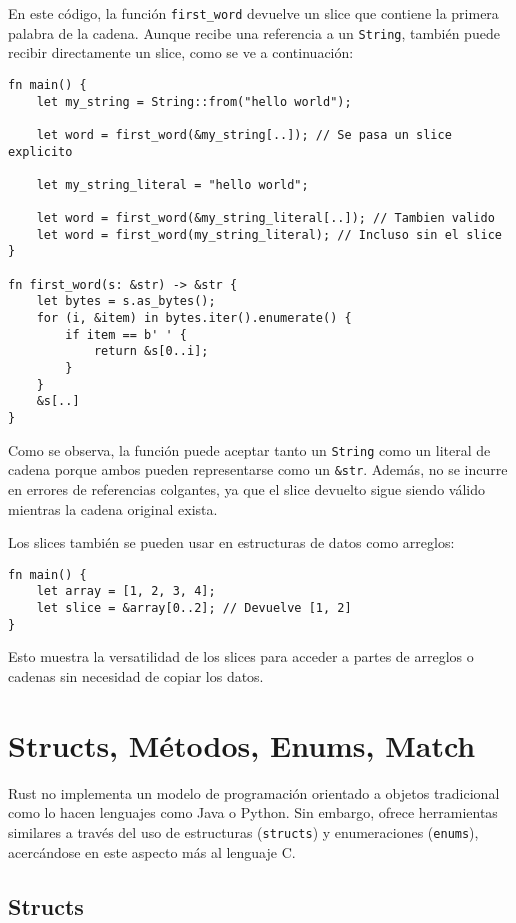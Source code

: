 \documentclass[12pt]{article}
\begin{document}
En este código, la función \texttt{first\_word} devuelve un slice que contiene la primera palabra de la cadena. Aunque recibe una referencia a un \texttt{String}, también puede recibir directamente un slice, como se ve a continuación:

\begin{lstlisting}[style=ruststyle]
fn main() {
	let my_string = String::from("hello world");

	let word = first_word(&my_string[..]); // Se pasa un slice explicito

	let my_string_literal = "hello world";

	let word = first_word(&my_string_literal[..]); // Tambien valido
	let word = first_word(my_string_literal); // Incluso sin el slice
}

fn first_word(s: &str) -> &str {
	let bytes = s.as_bytes();
	for (i, &item) in bytes.iter().enumerate() {
		if item == b' ' {
			return &s[0..i];
		}
	}
	&s[..]
}
\end{lstlisting}

Como se observa, la función puede aceptar tanto un \texttt{String} como un literal de cadena porque ambos pueden representarse como un \texttt{\&str}. Además, no se incurre en errores de referencias colgantes, ya que el slice devuelto sigue siendo válido mientras la cadena original exista.

Los slices también se pueden usar en estructuras de datos como arreglos:

\begin{lstlisting}[style=ruststyle]
fn main() {
	let array = [1, 2, 3, 4];
	let slice = &array[0..2]; // Devuelve [1, 2]
}
\end{lstlisting}

Esto muestra la versatilidad de los slices para acceder a partes de arreglos o cadenas sin necesidad de copiar los datos.

\section{Structs, Métodos, Enums, Match}

Rust no implementa un modelo de programación orientado a objetos tradicional como lo hacen lenguajes como Java o Python. Sin embargo, ofrece herramientas similares a través del uso de estructuras (\texttt{structs}) y enumeraciones (\texttt{enums}), acercándose en este aspecto más al lenguaje C.

\subsection{Structs}
\end{document}
